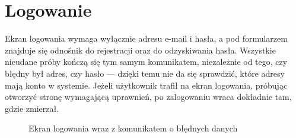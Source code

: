 \section{Logowanie}
\label{sec:prez-logowanie}

Ekran logowania wymaga wyłącznie adresu e-mail i hasła, a pod formularzem znajduje się odnośnik do rejestracji oraz do odzyskiwania hasła. Wszystkie nieudane próby kończą się tym samym komunikatem, niezależnie od tego, czy błędny był adres, czy hasło — dzięki temu nie da się sprawdzić, które adresy mają konto w systemie. Jeżeli użytkownik trafił na ekran logowania, próbując otworzyć stronę wymagającą uprawnień, po zalogowaniu wraca dokładnie tam, gdzie zmierzał.

\begin{figure}[htbp]
\centering
\caption{Ekran logowania wraz z komunikatem o błędnych danych}
\label{fig:prez-logowanie}
\end{figure}
